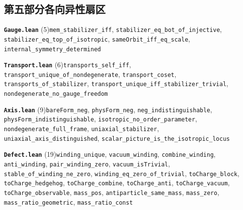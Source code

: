 \documentclass[11pt,a4paper]{article}
\theoremstyle{sudef}
\begin{document}
\subsection*{第五部分\quad 各向异性扇区}
\noindent\textbf{\texttt{Gauge.lean}} (5)\quad \texttt{mem\_\allowbreak stabilizer\_\allowbreak iff}, \texttt{stabilizer\_\allowbreak eq\_\allowbreak bot\_\allowbreak of\_\allowbreak injective}, \texttt{stabilizer\_\allowbreak eq\_\allowbreak top\_\allowbreak of\_\allowbreak isotropic}, \texttt{sameOrbit\_\allowbreak iff\_\allowbreak eq\_\allowbreak scale}, \texttt{internal\_\allowbreak symmetry\_\allowbreak determined}\par\smallskip
\noindent\textbf{\texttt{Transport.lean}} (6)\quad \texttt{transports\_\allowbreak self\_\allowbreak iff}, \texttt{transport\_\allowbreak unique\_\allowbreak of\_\allowbreak nondegenerate}, \texttt{transport\_\allowbreak coset}, \texttt{transports\_\allowbreak of\_\allowbreak stabilizer}, \texttt{transport\_\allowbreak unique\_\allowbreak iff\_\allowbreak stabilizer\_\allowbreak trivial}, \texttt{nondegenerate\_\allowbreak no\_\allowbreak gauge\_\allowbreak freedom}\par\smallskip
\noindent\textbf{\texttt{Axis.lean}} (9)\quad \texttt{bareForm\_\allowbreak neg}, \texttt{physForm\_\allowbreak neg}, \texttt{neg\_\allowbreak indistinguishable}, \texttt{physForm\_\allowbreak indistinguishable}, \texttt{isotropic\_\allowbreak no\_\allowbreak order\_\allowbreak parameter}, \texttt{nondegenerate\_\allowbreak full\_\allowbreak frame}, \texttt{uniaxial\_\allowbreak stabilizer}, \texttt{uniaxial\_\allowbreak axis\_\allowbreak distinguished}, \texttt{scalar\_\allowbreak picture\_\allowbreak is\_\allowbreak the\_\allowbreak isotropic\_\allowbreak locus}\par\smallskip
\noindent\textbf{\texttt{Defect.lean}} (19)\quad \texttt{winding\_\allowbreak unique}, \texttt{vacuum\_\allowbreak winding}, \texttt{combine\_\allowbreak winding}, \texttt{anti\_\allowbreak winding}, \texttt{pair\_\allowbreak winding\_\allowbreak zero}, \texttt{vacuum\_\allowbreak isTrivial}, \texttt{stable\_\allowbreak of\_\allowbreak winding\_\allowbreak ne\_\allowbreak zero}, \texttt{winding\_\allowbreak eq\_\allowbreak zero\_\allowbreak of\_\allowbreak trivial}, \texttt{toCharge\_\allowbreak block}, \texttt{toCharge\_\allowbreak hedgehog}, \texttt{toCharge\_\allowbreak combine}, \texttt{toCharge\_\allowbreak anti}, \texttt{toCharge\_\allowbreak vacuum}, \texttt{toCharge\_\allowbreak observable}, \texttt{mass\_\allowbreak pos}, \texttt{antiparticle\_\allowbreak same\_\allowbreak mass}, \texttt{mass\_\allowbreak zero}, \texttt{mass\_\allowbreak ratio\_\allowbreak geometric}, \texttt{mass\_\allowbreak ratio\_\allowbreak const}\par\smallskip
\end{document}
